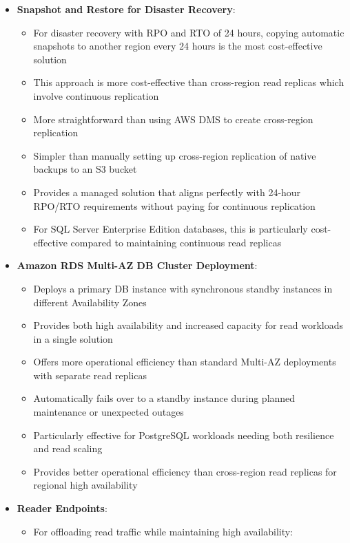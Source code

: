 \documentclass[11pt,a4paper]{report}
\begin{document}
\begin{itemize}
\begin{itemize}
  \item More cost-efficient than keeping the instance running continuously or modifying instance types repeatedly
\end{itemize}
  \item \textbf{Snapshot and Restore for Disaster Recovery}:
\begin{itemize}
  \item For disaster recovery with RPO and RTO of 24 hours, copying automatic snapshots to another region every 24 hours is the most cost-effective solution
  \item This approach is more cost-effective than cross-region read replicas which involve continuous replication
  \item More straightforward than using AWS DMS to create cross-region replication
  \item Simpler than manually setting up cross-region replication of native backups to an S3 bucket
  \item Provides a managed solution that aligns perfectly with 24-hour RPO/RTO requirements without paying for continuous replication
  \item For SQL Server Enterprise Edition databases, this is particularly cost-effective compared to maintaining continuous read replicas
\end{itemize}
  \item \textbf{Amazon RDS Multi-AZ DB Cluster Deployment}:
\begin{itemize}
  \item Deploys a primary DB instance with synchronous standby instances in different Availability Zones
  \item Provides both high availability and increased capacity for read workloads in a single solution
  \item Offers more operational efficiency than standard Multi-AZ deployments with separate read replicas
  \item Automatically fails over to a standby instance during planned maintenance or unexpected outages
  \item Particularly effective for PostgreSQL workloads needing both resilience and read scaling
  \item Provides better operational efficiency than cross-region read replicas for regional high availability
\end{itemize}
  \item \textbf{Reader Endpoints}:
\begin{itemize}
  \item For offloading read traffic while maintaining high availability:

\end{itemize}
\end{itemize}
\end{document}
